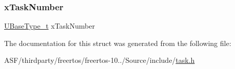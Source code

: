 \mbox{\label{structx_t_a_s_k___s_t_a_t_u_s_a93c24142b1453d7b03cc172a24cf1ecf}} 
\subsubsection{\texorpdfstring{xTaskNumber}{xTaskNumber}}
{\footnotesize\ttfamily \mbox{\hyperlink{portmacro_8h_a646f89d4298e4f5afd522202b11cb2e6}{U\+Base\+Type\+\_\+t}} x\+Task\+Number}



The documentation for this struct was generated from the following file\+:\begin{DoxyCompactItemize}
\item 
A\+S\+F/thirdparty/freertos/freertos-\/10../\+Source/include/\mbox{\hyperlink{task_8h}{task.\+h}}\end{DoxyCompactItemize}
